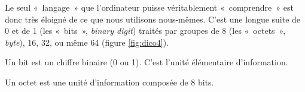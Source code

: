Le seul «~langage~» 
que l'ordinateur puisse véritablement «~comprendre~» 
est donc très éloigné de ce que nous utilisons nous-mêmes. 
C'est une 
longue suite de 0 et de 1 (les «~bits~», {\em binary digit}) traités par
groupes de 8 (les «~octets~», {\em byte}), 16, 32, ou même 64
(figure \ref{fig:dico4}). 

\begin{defin}
Un bit est un chiffre binaire (0 ou 1). 
C'est l'unité élémentaire d'information.
\end{defin}

\begin{defin}
Un octet  est une unité d'information composée de 8 bits.
\end{defin}

